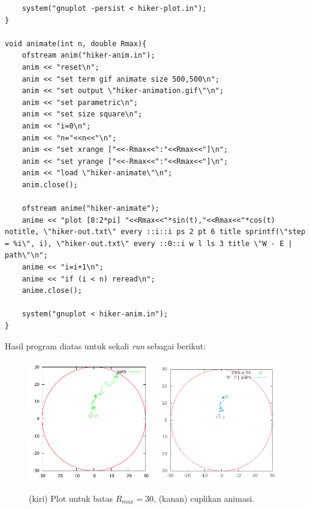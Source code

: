 \documentclass[paper=a4, fontsize=11pt]{scrartcl}
\numberwithin{equation}{section} %
\numberwithin{figure}{section} %
\numberwithin{table}{section} %
\begin{document}
\begin{lstlisting}
    system("gnuplot -persist < hiker-plot.in");
}

void animate(int n, double Rmax){
    ofstream anim("hiker-anim.in");
    anim << "reset\n";
    anim << "set term gif animate size 500,500\n";
    anim << "set output \"hiker-animation.gif\"\n";
    anim << "set parametric\n";
    anim << "set size square\n";
    anim << "i=0\n";
    anim << "n="<<n<<"\n";
    anim << "set xrange ["<<-Rmax<<":"<<Rmax<<"]\n";
    anim << "set yrange ["<<-Rmax<<":"<<Rmax<<"]\n";
    anim << "load \"hiker-animate\"\n";
    anim.close();

    ofstream anime("hiker-animate");
    anime << "plot [0:2*pi] "<<Rmax<<"*sin(t),"<<Rmax<<"*cos(t) notitle, \"hiker-out.txt\" every ::i::i ps 2 pt 6 title sprintf(\"step = %i\", i), \"hiker-out.txt\" every ::0::i w l ls 3 title \"W - E |  path\"\n";
    anime << "i=i+1\n";
    anime << "if (i < n) reread\n";
    anime.close();
    
    system("gnuplot < hiker-anim.in");
}
\end{lstlisting}

\vspace{2cm}
Hasil program diatas untuk sekali \textit{run} sebagai berikut:
\begin{figure}
	\centering
	\includegraphics[width=0.49\textwidth]{r30_1.png}
	\includegraphics[width=0.49\textwidth]{r30_2.png}
	\caption{(kiri) Plot untuk batas $R_{max} = 30$, (kanan) cuplikan animasi.}
\end{figure}
\end{document}
